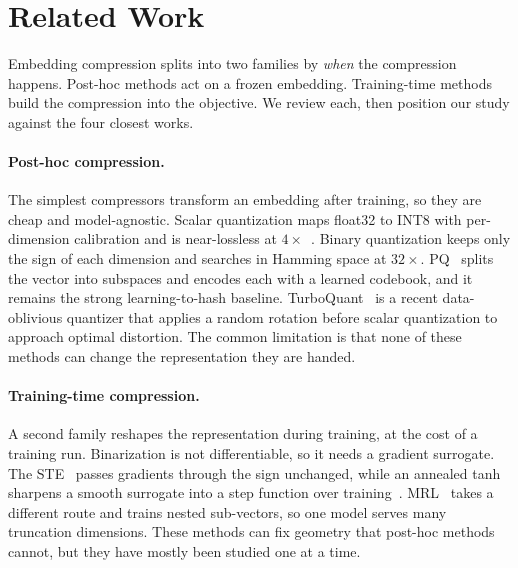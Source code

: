 \section{Related Work}
\label{sec:related}

Embedding compression splits into two families by \emph{when} the compression
happens. Post-hoc methods act on a frozen embedding. Training-time methods build
the compression into the objective. We review each, then position our study
against the four closest works.

\paragraph{Post-hoc compression.}
The simplest compressors transform an embedding after training, so they are cheap
and model-agnostic. Scalar quantization maps float32 to INT8 with per-dimension
calibration and is near-lossless at $4\times$~\citep{shakir2024embedding}. Binary
quantization keeps only the sign of each dimension and searches in Hamming space
at $32\times$. PQ~\citep{jegou2010product} splits the
vector into subspaces and encodes each with a learned codebook, and it remains
the strong learning-to-hash baseline. TurboQuant~\citep{zandieh2025turboquant}
is a recent data-oblivious quantizer that applies a random rotation before
scalar quantization to approach optimal distortion. The common limitation is
that none of these methods can change the representation they are handed.

\paragraph{Training-time compression.}
A second family reshapes the representation during training, at the cost of a
training run. Binarization is not differentiable, so it needs a gradient
surrogate. The STE~\citep{bengio2013estimating,
courbariaux2016bnn} passes gradients through the sign unchanged, while an annealed
tanh sharpens a smooth surrogate into a step function over
training~\citep{yamada2021efficient, yang2019quantization, schrodter2025trainable}.
MRL~\citep{kusupati2022matryoshka} takes a
different route and trains nested sub-vectors, so one model serves many truncation
dimensions. These methods can fix geometry that post-hoc methods cannot, but they
have mostly been studied one at a time.

